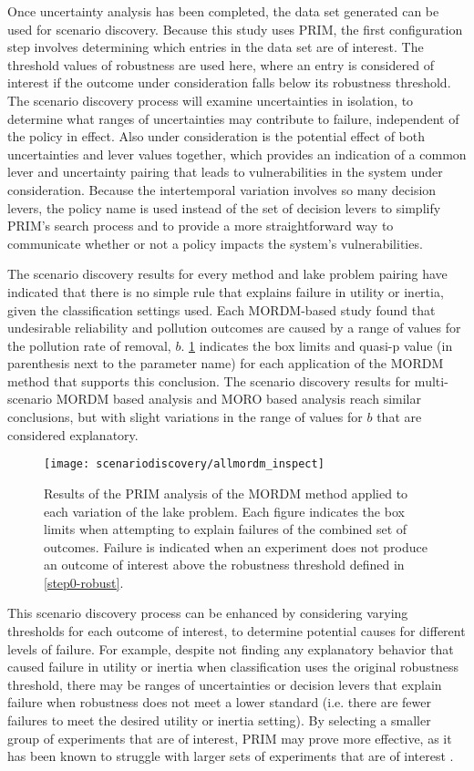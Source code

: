 Once uncertainty analysis has been completed, the data set generated can be used for scenario discovery. Because this study uses PRIM, the first configuration step involves determining which entries in the data set are of interest. The threshold values of robustness are used here, where an entry is considered of interest if the outcome under consideration falls below its robustness threshold. The scenario discovery process will examine uncertainties in isolation, to determine what ranges of uncertainties may contribute to failure, independent of the policy in effect. Also under consideration is the potential effect of both uncertainties and lever values together, which provides an indication of a common lever and uncertainty pairing that leads to vulnerabilities in the system under consideration. Because the intertemporal variation involves so many decision levers, the policy name is used instead of the set of decision levers to simplify PRIM's search process and to provide a more straightforward way to communicate whether or not a policy impacts the system's vulnerabilities. 

The scenario discovery results for every method and lake problem pairing have indicated that there is no simple rule that explains failure in utility or inertia, given the classification settings used. Each MORDM-based study found that undesirable reliability and pollution outcomes are caused by a range of values for the pollution rate of removal, $b$. \cref{fig:mordm-PRIM} indicates the box limits and quasi-p value (in parenthesis next to the parameter name) for each application of the MORDM method that supports this conclusion. The scenario discovery results for multi-scenario MORDM based analysis and MORO based analysis reach similar conclusions, but with slight variations in the range of values for $b$ that are considered explanatory. 

\begin{figure}[ht]
    \texttt{[image: scenariodiscovery/allmordm\_inspect]}
    \caption[Results of PRIM Analysis]{Results of the PRIM analysis of the MORDM method applied to each variation of the lake problem. Each figure indicates the box limits when attempting to explain failures of the combined set of outcomes. Failure is indicated when an experiment does not produce an outcome of interest above the robustness threshold defined in \cref{step0-robust}.} 
    \label{fig:mordm-PRIM}
\end{figure}

This scenario discovery process can be enhanced by considering varying thresholds for each outcome of interest, to determine potential causes for different levels of failure. For example, despite not finding any explanatory behavior that caused failure in utility or inertia when classification uses the original robustness threshold, there may be ranges of uncertainties or decision levers that explain failure when robustness does not meet a lower standard (i.e. there are fewer failures to meet the desired utility or inertia setting). By selecting a smaller group of experiments that are of interest, PRIM may prove more effective, as it has been known to struggle with larger sets of experiments that are of interest \citep{Kwakkel2017}. 
